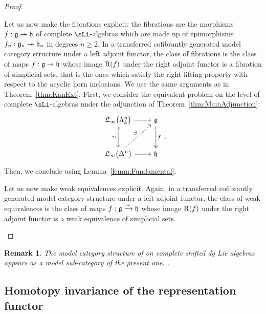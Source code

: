 \documentclass[twoside, 10pt]{amsart}
\newtheorem{remark}[lemma]{Remark}
\begin{document}
\begin{proof}
\begin{description}
Let us now make the fibrations explicit: 
the fibrations are the morphisms $f  :  \mathfrak{g}\twoheadrightarrow \mathfrak{h}$ of complete $\sLi$-algebras which are made up of  epimorphisms $f_n  :  \mathfrak{g}_n \twoheadrightarrow \mathfrak{h}_n$ in degrees $n\geqslant 2$. In a transferred cofibrantly generated model category structure under  a left adjoint functor, the class of fibrations is the class of maps $f  :  \mathfrak{g}\twoheadrightarrow \mathfrak{h}$ whose image $\mathrm{R}(f)$ under the right adjoint functor is a fibration of simplicial sets, that is the ones which  satisfy the right lifting property with respect to the acyclic horn inclusions. We use the same arguments as in Theorem~\ref{thm:KanExt}. First, we consider the equivalent problem on the level of complete $\sLi$-algebras under the adjunction of Theorem~\ref{thm:MainAdjunction}: 
\[
\vcenter{\hbox{
\begin{tikzcd}[column sep=0.8cm, row sep=1cm]
\Li\big(\Ho{k}{n}\big)
\arrow[d, hookrightarrow, , "\sim"']
\arrow[r]
& \g \arrow[d, "f", twoheadrightarrow]
\\
\Li\big(\De{n}\big) \arrow[ur, dashrightarrow, "\exists "] \arrow[r]
& \h
\end{tikzcd}
}}.
\]
Then, we conclude using Lemma~\ref{lemm:Fundamental}. 

Let us now make weak equivalences explicit. 
Again, in a transferred cofibrantly generated model category structure under  a left adjoint functor, the class of weak equivalences is the class of maps $f  :  \mathfrak{g}\xrightarrow{\sim} \mathfrak{h}$ whose image $\mathrm{R}(f)$ under the right adjoint functor is a weak equivalence of simplicial sets. 

\end{description}
\end{proof}

\begin{remark}
The model category structure of \cite{BFMT16} on complete shifted dg Lie algebras appears as a model sub-category of the present one.  .

\end{remark}



\subsection{Homotopy invariance of the representation functor}
\end{document}
